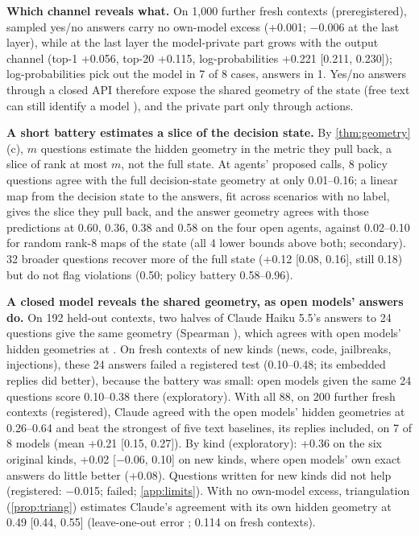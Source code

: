 \textbf{Which channel reveals what.} On 1{,}000 further fresh contexts (preregistered), sampled yes/no answers carry no own-model excess (+0.001; $-$0.006 at the last layer), while at the last layer the model-private part grows with the output channel (top-1 +0.056, top-20 +0.115, log-probabilities +0.221 [0.211, 0.230]); log-probabilities pick out the model in 7 of 8 cases, answers in 1. Yes/no answers through a closed API therefore expose the shared geometry of the state (free text can still identify a model \citep{pasquini2024llmmap,gao2024model}), and the private part only through actions.

\textbf{A short battery estimates a slice of the decision state.} By \cref{thm:geometry}(c), $m$ questions estimate the hidden geometry in the metric they pull back, a slice of rank at most $m$, not the full state. At agents' proposed calls, 8 policy questions agree with the full decision-state geometry at only 0.01--0.16; a linear map from the decision state to the answers, fit across scenarios with no label, gives the slice they pull back, and the answer geometry agrees with those predictions at 0.60, 0.36, 0.38 and 0.58 on the four open agents, against 0.02--0.10 for random rank-8 maps of the state (all 4 lower bounds above both; secondary). 32 broader questions recover more of the full state (+0.12 [0.08, 0.16], still 0.18) but do not flag violations (0.50; policy battery 0.58--0.96).

\textbf{A closed model reveals the shared geometry, as open models' answers do.} On 192 held-out contexts, two halves of Claude Haiku 5.5's answers to 24 questions give the same geometry (Spearman \GTwoSplit), which agrees with open models' hidden geometries at \GTwoOpen. On fresh contexts of new kinds (news, code, jailbreaks, injections), these 24 answers failed a registered test (0.10--0.48; its embedded replies did better), because the battery was small: open models given the same 24 questions score 0.10--0.38 there (exploratory). With all 88, on 200 further fresh contexts (registered), Claude agreed with the open models' hidden geometries at 0.26--0.64 and beat the strongest of five text baselines, its replies included, on 7 of 8 models (mean +0.21 [0.15, 0.27]). By kind (exploratory): +0.36 on the six original kinds, +0.02 [$-$0.06, 0.10] on new kinds, where open models' own exact answers do little better (+0.08). Questions written for new kinds did not help (registered: $-$0.015; failed; \cref{app:limits}). With no own-model excess, triangulation (\cref{prop:triang}) estimates Claude's agreement with its own hidden geometry at 0.49 [0.44, 0.55] (leave-one-out error \GVtMae; 0.114 on fresh contexts).


